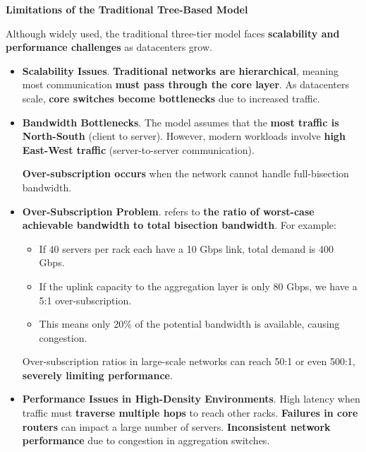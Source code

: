 \highspace
\begin{flushleft}
    \textcolor{Red2}{ \textbf{Limitations of the Traditional Tree-Based Model}}
\end{flushleft}
Although widely used, the traditional three-tier model faces \textbf{scalability and performance challenges} as datacenters grow.
\begin{itemize}
    \item \textcolor{Red2}{\textbf{Scalability Issues}}. \textbf{Traditional networks are hierarchical}, meaning most communication \textbf{must pass through the core layer}. As datacenters scale, \textbf{core switches become bottlenecks} due to increased traffic.

    \item \textcolor{Red2}{\textbf{Bandwidth Bottlenecks}}. The model assumes that the \textbf{most traffic is North-South} (client to server). However, modern workloads involve \textbf{high East-West traffic} (server-to-server communication).
    
    \textbf{Over-subscription occurs} when the network cannot handle full-bisection bandwidth.

    \item \textcolor{Red2}{\textbf{Over-Subscription Problem}}.  refers to \textbf{the ratio of worst-case achievable bandwidth to total bisection bandwidth}. For example:
    \begin{itemize}
        \item If 40 servers per rack each have a 10 Gbps link, total demand is 400 Gbps.
        \item If the uplink capacity to the aggregation layer is only 80 Gbps, we have a 5:1 over-subscription.
        \item This means only 20\% of the potential bandwidth is available, causing congestion.
    \end{itemize}
    Over-subscription ratios in large-scale networks can reach 50:1 or even 500:1, \textbf{severely limiting performance}.

    \item \textcolor{Red2}{\textbf{Performance Issues in High-Density Environments}}. High latency when traffic must \textbf{traverse multiple hops} to reach other racks. \textbf{Failures in core routers} can impact a large number of servers. \textbf{Inconsistent network performance} due to congestion in aggregation switches.
\end{itemize}

